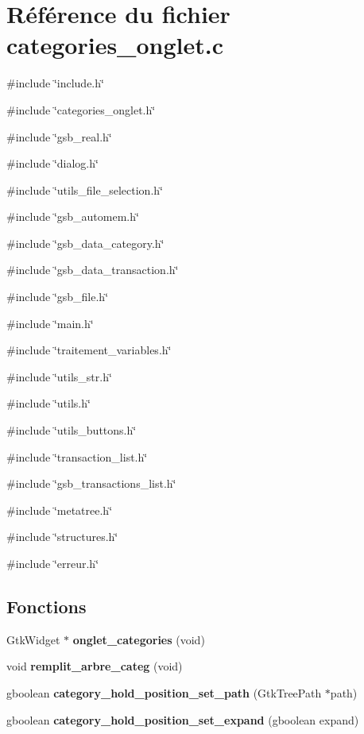 \section{Référence du fichier categories\_\-onglet.c}
\label{categories__onglet_8c}
{\ttfamily \#include \char`\"{}include.h\char`\"{}}\par
{\ttfamily \#include \char`\"{}categories\_\-onglet.h\char`\"{}}\par
{\ttfamily \#include \char`\"{}gsb\_\-real.h\char`\"{}}\par
{\ttfamily \#include \char`\"{}dialog.h\char`\"{}}\par
{\ttfamily \#include \char`\"{}utils\_\-file\_\-selection.h\char`\"{}}\par
{\ttfamily \#include \char`\"{}gsb\_\-automem.h\char`\"{}}\par
{\ttfamily \#include \char`\"{}gsb\_\-data\_\-category.h\char`\"{}}\par
{\ttfamily \#include \char`\"{}gsb\_\-data\_\-transaction.h\char`\"{}}\par
{\ttfamily \#include \char`\"{}gsb\_\-file.h\char`\"{}}\par
{\ttfamily \#include \char`\"{}main.h\char`\"{}}\par
{\ttfamily \#include \char`\"{}traitement\_\-variables.h\char`\"{}}\par
{\ttfamily \#include \char`\"{}utils\_\-str.h\char`\"{}}\par
{\ttfamily \#include \char`\"{}utils.h\char`\"{}}\par
{\ttfamily \#include \char`\"{}utils\_\-buttons.h\char`\"{}}\par
{\ttfamily \#include \char`\"{}transaction\_\-list.h\char`\"{}}\par
{\ttfamily \#include \char`\"{}gsb\_\-transactions\_\-list.h\char`\"{}}\par
{\ttfamily \#include \char`\"{}metatree.h\char`\"{}}\par
{\ttfamily \#include \char`\"{}structures.h\char`\"{}}\par
{\ttfamily \#include \char`\"{}erreur.h\char`\"{}}\par
\subsection*{Fonctions}
\begin{DoxyCompactItemize}
\item 
GtkWidget $\ast$ {\bf onglet\_\-categories} (void)
\item 
void {\bf remplit\_\-arbre\_\-categ} (void)
\item 
gboolean {\bf category\_\-hold\_\-position\_\-set\_\-path} (GtkTreePath $\ast$path)
\item 
gboolean {\bf category\_\-hold\_\-position\_\-set\_\-expand} (gboolean expand)
\end{DoxyCompactItemize}
